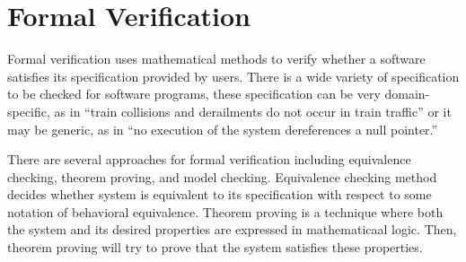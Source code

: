 \section*{Formal Verification} 

Formal verification uses mathematical methods to verify  whether a software satisfies its specification provided by users. 
There is a wide variety of specification to be checked for software programs, these specification can be very domain-specific, as in “train collisions and derailments do not occur in train traffic” or it may be generic, as in “no execution of the system dereferences a null pointer.” 
%

There are several approaches for formal verification  including equivalence checking, theorem proving, and model checking. Equivalence checking method decides whether  system is equivalent to its specification with respect to some notation  of behavioral equivalence.  Theorem proving is a technique where both the  system and its desired properties are expressed in mathematicaal logic. Then, theorem proving  will try to prove that the system satisfies these properties. 

